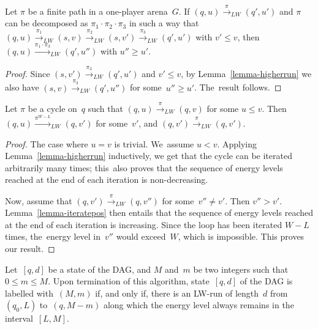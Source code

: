 Let $\pi$ be a finite path in a one-player arena~$G$.
  If $(q,u) \xrightarrow{\pi}_{LW} (q',u')$ and $\pi$ can be decomposed as
  $\pi_1\cdot\pi_2\cdot \pi_3$ in such a way that
  $(q,u) \xrightarrow{\pi_1}_{LW}
  (s,v)\xrightarrow{\pi_2}_{LW}(s,v') \xrightarrow{\pi_3}_{LW}(q',u')$ with $v'\leq
  v$, then $(q,u)\xrightarrow{\pi_1\cdot\pi_3}_{LW} (q',u'')$ with $u''\geq
  u'$.

\begin{proof}
Since $(s,v') \xrightarrow{\pi_3}_{LW}(q',u')$ and $v'\leq v$, by
Lemma~\ref{lemma-higherrun} 
we also have $(s,v)
\xrightarrow{\pi_3}_{LW}(q',u'')$ for some~$u''\geq u'$. The~result follows.
\end{proof}


Let $\pi$ be a cycle on~$q$ such that $(q,u) \xrightarrow{\pi}_{LW} (q,v)$
  for some $u\leq v$. Then $(q,u) \xrightarrow{\pi^{W-L}}_{LW} (q,v')$ for
  some~$v'$, and $(q,v')\xrightarrow{\pi}_{LW} (q,v')$.


\begin{proof}
  The case where $u=v$ is trivial. We~assume $u<v$.  Applying
  Lemma~\ref{lemma-higherrun} inductively, we get that the cycle can
  be iterated arbitrarily many times; this~also proves that the
  sequence of energy levels reached at the end of each iteration is
  non-decreasing.

  Now, assume that $(q,v')\xrightarrow{\pi}_{LW} (q,v'')$ for
  some~$v''\not=v'$.  Then $v''>v'$. Lemma~\ref{lemma-iteratepos} then
  entails that the sequence of energy levels reached at the end of
  each iteration is increasing. Since the loop has been iterated $W-L$
  times, the~energy level in~$v''$ would exceed~$W$, which is
  impossible. This proves our result.
\end{proof}


  Let~$[q,d]$ be a state of the DAG, and $M$ and~$m$ be two integers
  such that $0\leq m\leq M$.  Upon termination of this algorithm, 
  state~$[q,d]$ of the DAG is labelled with~$(M,m)$ if, and only if,
  there is an LW-run of length~$d$ from~$(q_0,L)$ to~$(q,M-m)$ along
  which the energy level always remains in the interval~$[L,M]$.

